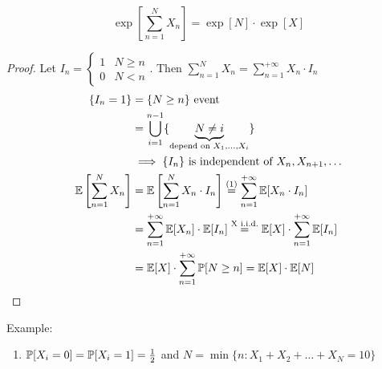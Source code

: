 \begin{equation}
  \exp\left[\sum\limits_{n=1}^N X_n \right] = \exp[N] \cdot \exp[X]
\end{equation}
\begin{proof}
  Let $I_n = \begin{cases} 1 & N \ge n \\ 0 & N<n \end{cases}$. Then $\sum\limits_{n=1}^N X_n = \sum\limits_{n=1}^{+\infty} X_n \cdot I_n$
\begin{equation}\begin{split}
  \{I_n=1\} &= \{N \ge n \} \text{ event}\\
  &= \bigcup\limits_{i=1}^{n-1}\{\underbrace{N \neq i}_{\text{depend on } X_1, \dots, X_i} \} \\
  &\implies \{I_n\} \text{ is independent of }X_n, X_{n+1}, \dots\\
  \mathbb{E}\left[\sum\limits_{n=1}^{N}X_n\right] &= \mathbb{E}\left[\sum\limits_{n=1}^{N}X_n \cdot I_n \right] \stackrel{(1)}{=} \sum\limits_{n=1}^{+\infty}\mathbb{E}[X_n \cdot I_n] \\
  &=\sum\limits_{n=1}^{+\infty}\mathbb{E}[X_n] \cdot \mathbb{E}[I_n] \stackrel{\text{X i.i.d.}}{=} \mathbb{E}[X]\cdot\sum\limits_{n=1}^{+\infty}\mathbb{E}[I_n] \\
  &= \mathbb{E}[X] \cdot \sum\limits_{n=1}^{+\infty}\mathbb{P}[N \ge n] = \mathbb{E}[X] \cdot \mathbb{E}[N]
\end{split}\end{equation}
\end{proof}

Example:
\begin{enumerate}
  \item $\mathbb{P}[X_i=0]=\mathbb{P}[X_i = 1] = \frac{1}{2}$ and $N = \min\{n : X_1 + X_2 + \dots + X_N =10\}$
\end{enumerate}
